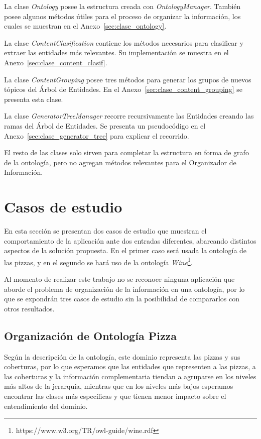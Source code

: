 La clase \emph{Ontology} posee la estructura creada con \emph{OntologyManager}. También posee algunos métodos útiles para el proceso de organizar la información, los cuales se muestran en el Anexo~\ref{sec:clase_ontology}.

La clase \emph{ContentClasification} contiene los métodos necesarios para clasificar y extraer las entidades más relevantes. Su implementación se muestra en el Anexo~\ref{sec:clase_content_clasif}.

La clase \emph{ContentGrouping} posee tres métodos para generar los grupos de nuevos tópicos del Árbol de Entidades. En el Anexo~\ref{sec:clase_content_grouping} se presenta esta clase.

La clase \emph{GeneratorTreeManager} recorre recursivamente las Entidades creando las ramas del Árbol de Entidades. Se presenta un pseudocódigo en el Anexo~\ref{sec:clase_generator_tree} para explicar el recorrido.

El resto de las clases solo sirven para completar la estructura en forma de grafo de la ontología, pero no agregan métodos relevantes para el Organizador de Información.



\section{Casos de estudio}
En esta sección se presentan dos casos de estudio que muestran el comportamiento de la aplicación ante dos entradas diferentes, abarcando distintos aspectos de la solución propuesta. En el primer caso será usada la ontología de las pizzas, y en el segundo se hará uso de la ontología \emph{Wine}\footnote{https://www.w3.org/TR/owl-guide/wine.rdf}.

Al momento de realizar este trabajo no se reconoce ninguna aplicación que aborde el problema de organización de la información en una ontología, por lo que se expondrán tres casos de estudio sin la posibilidad de compararlos con otros resultados.

\subsection{Organización de Ontología Pizza}
Según la descripción de la ontología, este dominio representa las pizzas y sus coberturas, por lo que esperamos que las entidades que representen a las pizzas, a las coberturas y la información complementaria tiendan a agruparse en los niveles más altos de la jerarquía, mientras que en los niveles más bajos esperamos encontrar las clases más específicas y que tienen menor impacto sobre el entendimiento del dominio.

